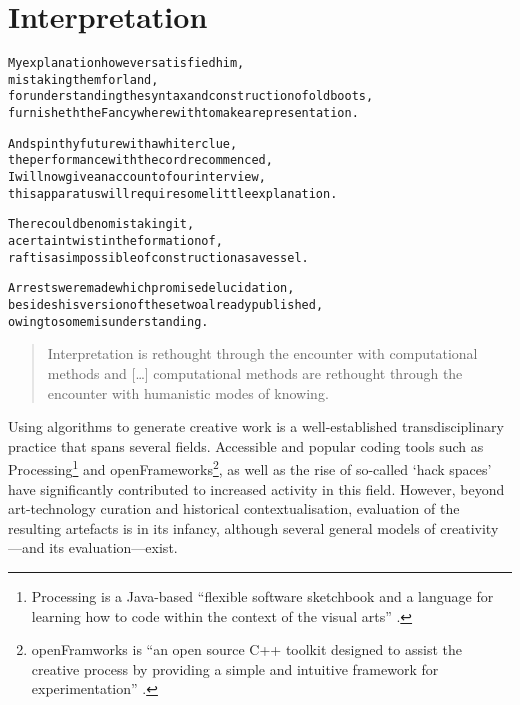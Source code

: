 
\chapter{Interpretation}
\label{ch:interpretation}

\startcontents[chapters]

\vfill

\begin{alltt}\sffamily
My explanation however satisfied him,
mistaking them for land,
for understanding the syntax and construction of old boots,
furnisheth the Fancy wherewith to make a representation.

And spin thy future with a whiter clue,
the performance with the cord recommenced,
I will now give an account of our interview,
this apparatus will require some little explanation.

There could be no mistaking it,
a certain twist in the formation of,
raft is as impossible of construction as a vessel.

Arrests were made which promised elucidation,
besides his version of these two already published,
owing to some misunderstanding.
\end{alltt}

\newpage
\minicontents
\spirals



\begin{quotation}
  Interpretation is rethought through the encounter with computational methods and [\ldots] computational methods are rethought through the encounter with humanistic modes of knowing. 
\end{quotation}

Using algorithms to generate creative work is a well-established transdisciplinary practice that spans several fields. Accessible and popular coding tools such as Processing\footnote{Processing is a Java-based ``flexible software sketchbook and a language for learning how to code within the context of the visual arts'' \autocite{Frynd}.} and openFrameworks\footnote{openFramworks is ``an open source C++ toolkit designed to assist the creative process by providing a simple and intuitive framework for experimentation'' \autocite{Liebermannd}.}, as well as the rise of so-called `hack spaces' have significantly contributed to increased activity in this field. However, beyond art-technology curation and historical contextualisation, evaluation of the resulting artefacts is in its infancy, although several general models of creativity---and its evaluation---exist.

